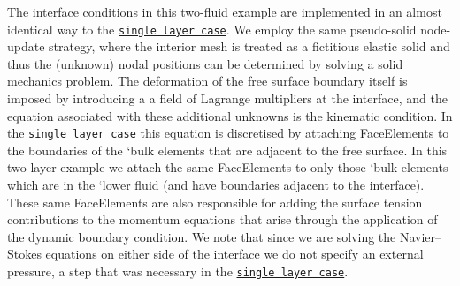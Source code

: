 The interface conditions in this two-\/fluid example are implemented in an almost identical way to the \href{../../single_layer_free_surface/html/index.html#implementation}{\tt single layer case}. We employ the same pseudo-\/solid node-\/update strategy, where the interior mesh is treated as a fictitious elastic solid and thus the (unknown) nodal positions can be determined by solving a solid mechanics problem. The deformation of the free surface boundary itself is imposed by introducing a a field of Lagrange multipliers at the interface, and the equation associated with these additional unknowns is the kinematic condition. In the \href{../../single_layer_free_surface/html/index.html#implementation}{\tt single layer case} this equation is discretised by attaching {\ttfamily Face\+Elements} to the boundaries of the `bulk\textquotesingle{} elements that are adjacent to the free surface. In this two-\/layer example we attach the same {\ttfamily Face\+Elements} to only those `bulk\textquotesingle{} elements which are in the `lower\textquotesingle{} fluid (and have boundaries adjacent to the interface). These same {\ttfamily Face\+Elements} are also responsible for adding the surface tension contributions to the momentum equations that arise through the application of the dynamic boundary condition. We note that since we are solving the Navier--Stokes equations on either side of the interface we do not specify an external pressure, a step that was necessary in the \href{../../single_layer_free_surface/html/index.html#implementation}{\tt single layer case}.

